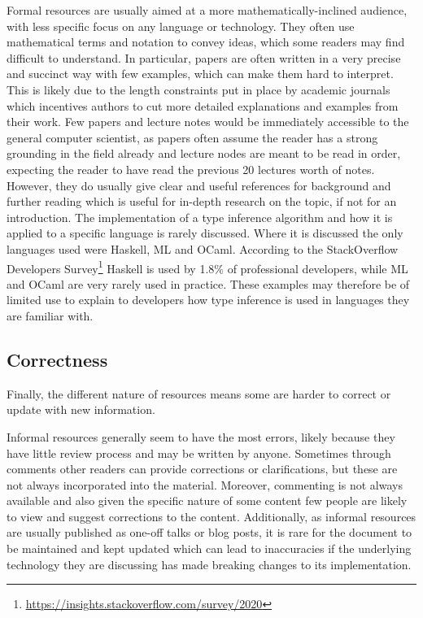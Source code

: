 \documentclass[a4paper,fleqn,oneside,12pt]{report}
\begin{document}
Formal resources are usually aimed at a more mathematically-inclined audience, with less specific focus on any language or technology. They often use mathematical terms and notation to convey ideas, which some readers may find difficult to understand. In particular, papers are often written in a very precise and succinct way with few examples, which can make them hard to interpret. This is likely due to the length constraints put in place by academic journals which incentives authors to cut more detailed explanations and examples from their work. Few papers and lecture notes would be immediately accessible to the general computer scientist, as papers often assume the reader has a strong grounding in the field already and lecture nodes are meant to be read in order, expecting the reader to have read the previous 20 lectures worth of notes. However, they do usually give clear and useful references for background and further reading which is useful for in-depth research on the topic, if not for an introduction. The implementation of a type inference algorithm and how it is applied to a specific language is rarely discussed. Where it is discussed the only languages used were Haskell, ML and OCaml. According to the StackOverflow Developers Survey\footnote{\underline{\href{https://insights.stackoverflow.com/survey/2020\#technology-programming-scripting-and-markup-languages}{https://insights.stackoverflow.com/survey/2020}}} Haskell is used by 1.8\% of professional developers, while ML and OCaml are very rarely used in practice. These examples may therefore be of limited use to explain to developers how type inference is used in languages they are familiar with.

\subsection{Correctness}

Finally, the different nature of resources means some are harder to correct or update with new information.

Informal resources generally seem to have the most errors, likely because they have little review process and may be written by anyone. Sometimes through comments other readers can provide corrections or clarifications, but these are not always incorporated into the material. Moreover, commenting is not always available and also given the specific nature of some content few people are likely to view and suggest corrections to the content. Additionally, as informal resources are usually published as one-off talks or blog posts, it is rare for the document to be maintained and kept updated which can lead to inaccuracies if the underlying technology they are discussing has made breaking changes to its implementation.
\end{document}
